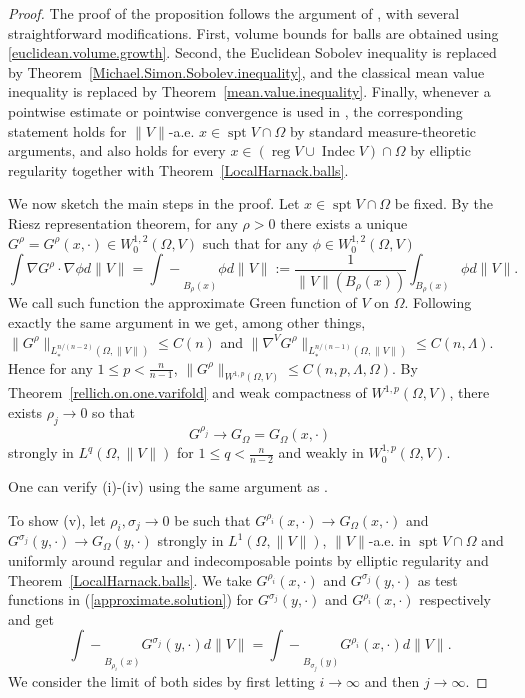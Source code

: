 \documentclass[11pt]{amsart}
\theoremstyle{definition}
\newcommand{\fint}{\mathrel{\int\!\!\!\!\!\!-}}
\DeclareMathOperator{\spt}{spt}
\DeclareMathOperator{\reg}{reg}
\DeclareMathOperator{\indec}{Indec}
\begin{document}
\begin{proof}
    The proof of the proposition follows the argument of \cite[Theorem 1.1]{gruter1982green}, with several straightforward modifications. First, volume bounds for balls are obtained using \eqref{euclidean.volume.growth}. Second, the Euclidean Sobolev inequality is replaced by Theorem~\ref{Michael.Simon.Sobolev.inequality}, and the classical mean value inequality is replaced by Theorem~\ref{mean.value.inequality}. Finally, whenever a pointwise estimate or pointwise convergence is used in \cite{gruter1982green}, the corresponding statement holds for $\|V\|$-a.e. $x \in \spt V\cap\Omega$ by standard measure-theoretic arguments, and also holds for every $x \in (\reg V \cup \indec V)\cap \Omega$ by elliptic regularity \cite{GT} together with Theorem~\ref{LocalHarnack.balls}.

	We now sketch the main steps in the proof. Let $x\in \spt V\cap \Omega$ be fixed. By the Riesz representation theorem, for any $\rho>0$ there exists a unique $G^\rho=G^\rho(x,\cdot)\in W_0^{1,2}(\Omega,V)$ such that for any $\phi\in W_0^{1,2}(\Omega,V)$
	\begin{equation}
		\int \nabla G^\rho\cdot \nabla\phi d\|V\|=\fint_{B_\rho (x)}\phi d\|V\|:=\frac{1}{\|V\|(B_\rho(x))}\int_{B_\rho(x)}\phi d\|V\|.\label{approximate.solution}
	\end{equation}
    We call such function the approximate Green function of $V$ on $\Omega$. Following exactly the same argument in \cite[Theorem 1.1]{gruter1982green} we get, among other things, $\|G^\rho\|_{L_*^{n/(n-2)}(\Omega,\|V\|)}\le C(n)$ and $\|\nabla^V G^\rho\|_{L_*^{n/(n-1)}(\Omega,\|V\|)}\le C(n,\Lambda)$.   Hence for any $1\le p<\frac{n}{n-1}$, $\|G^\rho\|_{W^{1,p}(\Omega,V)}\le C(n,p,\Lambda,\Omega)$.
	By Theorem~\ref{rellich.on.one.varifold} and weak compactness of $W^{1,p}(\Omega,V)$, there exists $\rho_j\to0$ so that \begin{equation}\label{Grho.to.GOmega}
		G^{\rho_j}\to G_\Omega=G_\Omega(x,\cdot)
	\end{equation} strongly in $L^q(\Omega,\|V\|)$ for $1\le q<\frac{n}{n-2}$ and weakly in $W^{1,p}_0(\Omega,V)$.
    
	One can verify (i)-(iv) using the same argument as \cite[Theorem 1.1]{gruter1982green}.
	
	To show (v), let $\rho_i,\sigma_j\to0$ be such that $G^{\rho_i}(x,\cdot)\to G_\Omega(x,\cdot)$ and $G^{\sigma_j}(y,\cdot)\to G_\Omega(y,\cdot)$ strongly in $L^1(\Omega,\|V\|)$, $\|V\|$-a.e. in $\spt V\cap \Omega$ and uniformly around regular and indecomposable points by elliptic regularity \cite{GT} and Theorem~\ref{LocalHarnack.balls}. We take $G^{\rho_i}(x,\cdot)$ and $G^{\sigma_j}(y,\cdot)$ as test functions in (\ref{approximate.solution}) for $G^{\sigma_j}(y,\cdot)$ and $G^{\rho_i}(x,\cdot)$ respectively and get
	\[
		\fint_{B_{\rho_i}(x)}G^{\sigma_j}(y,\cdot)d\|V\|=\fint_{B_{\sigma_j}(y)}G^{\rho_i}(x,\cdot)d\|V\|.
	\]
	We consider the limit of both sides by first letting $i\to\infty$ and then $j\to\infty$.
	

\end{proof}
\end{document}
